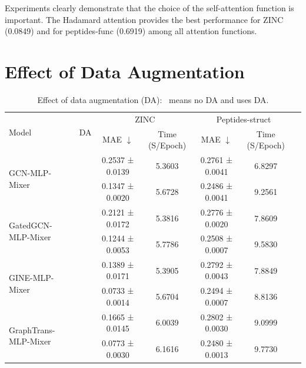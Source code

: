\documentclass{article}
\newcommand{\cmark}{\ding{51}}%
\newcommand{\xmark}{\ding{55}}%
\begin{document}
Experiments clearly demonstrate that the choice of the self-attention function is important. The Hadamard attention provides the best performance for ZINC (0.0849) and for peptides-func (0.6919) among all attention functions.



\section{Effect of Data Augmentation}\label{app sec: da}
\begin{table}[!ht]
\caption{Effect of data augmentation (DA): \xmark \ means no DA and \cmark uses DA.}
\footnotesize
    \centering
    \begin{tabular}{lcccccc}
    \toprule
         \multirow{2}{*}{Model} & \multirow{2}{*}{DA}
         &  \multicolumn{2}{c}{ZINC} &  \multicolumn{2}{c}{Peptides-struct} \\
         \cmidrule(lr){3-4}\cmidrule(lr){5-6}
         & & MAE $\downarrow$ & Time (S/Epoch) & MAE $\downarrow$ & Time (S/Epoch) \\
         \midrule
         \multirow{2}{*}{GCN-MLP-Mixer} 
         & \xmark 
         & 0.2537 ± 0.0139 & 5.3603
         & 0.2761 ± 0.0041 & 6.8297\\
          & \cmark 
          & 0.1347 ± 0.0020 & 5.6728
          & 0.2486 ± 0.0041 & 9.2561\\
          \midrule
          
          \multirow{2}{*}{GatedGCN-MLP-Mixer} 
         & \xmark 
         & 0.2121 ± 0.0172 & 5.3816
         & 0.2776 ± 0.0020 & 7.8609\\
          & \cmark 
          & 0.1244 ± 0.0053 & 5.7786
          & 0.2508 ± 0.0007 & 9.5830\\
          \midrule
          
          \multirow{2}{*}{GINE-MLP-Mixer} 
         & \xmark 
         & 0.1389 ± 0.0171 & 5.3905
         & 0.2792 ± 0.0043 & 7.8849\\
          & \cmark 
          & 0.0733 ± 0.0014 & 5.6704
          & 0.2494 ± 0.0007 & 8.8136\\
          \midrule
          
          \multirow{2}{*}{GraphTrans-MLP-Mixer} 
         & \xmark 
         & 0.1665 ± 0.0145 & 6.0039
         & 0.2802 ± 0.0030 & 9.0999\\
          & \cmark 
          & 0.0773 ± 0.0030 & 6.1616
          & 0.2480 ± 0.0013 & 9.7730\\
         \bottomrule
    \end{tabular}
    \label{app tab: Data Augmentation}
\end{table}
\end{document}

